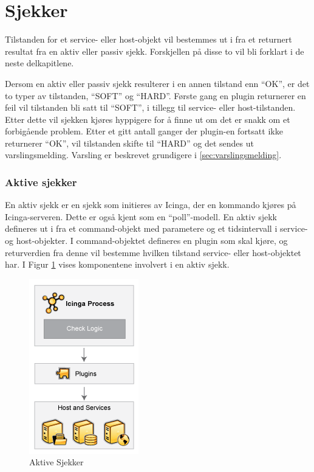 \section{Sjekker}\label{sec:sjekker}
Tilstanden for et service- eller host-objekt vil bestemmes ut i fra et returnert resultat fra en aktiv eller passiv sjekk. Forskjellen på disse to vil bli forklart i de neste delkapitlene.

Dersom en aktiv eller passiv sjekk resulterer i en annen tilstand enn ``OK'', er det to typer av tilstanden, ``SOFT'' og ``HARD''. Første gang en plugin returnerer en feil vil tilstanden bli satt til ``SOFT'', i tillegg til service- eller host-tilstanden. Etter dette vil sjekken kjøres hyppigere for å finne ut om det er snakk om et forbigående problem. Etter et gitt antall ganger der plugin-en fortsatt ikke returnerer ``OK'', vil tilstanden skifte til ``HARD'' og det sendes ut varslingsmelding. Varsling er beskrevet grundigere i \ref{sec:varslingsmelding}.

\subsubsection{Aktive sjekker}
En aktiv sjekk er en sjekk som initieres av Icinga, der en kommando kjøres på Icinga-serveren. Dette er også kjent som en ``poll''-modell. En aktiv sjekk defineres ut i fra et command-objekt med parametere og et tidsintervall i service- og host-objekter. I command-objektet defineres en plugin som skal kjøre, og returverdien fra denne vil bestemme hvilken tilstand service- eller host-objektet har. I Figur \ref{active_checks} vises komponentene involvert i en aktiv sjekk.
\begin{figure}
   \centering 
   \includegraphics[scale=0.7]{img/activechecks.png}
    \caption{Aktive Sjekker}
    \label{active_checks}
\end{figure}

